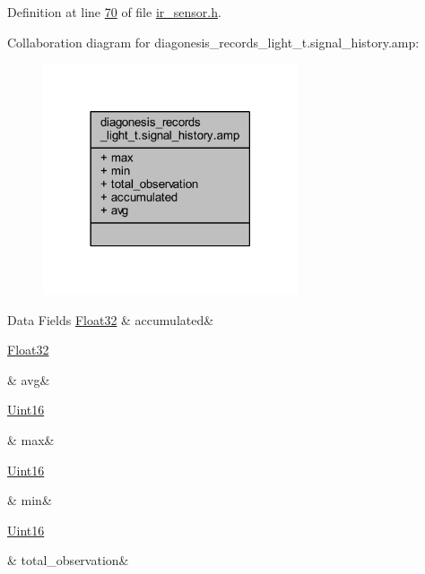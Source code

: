 Definition at line \hyperlink{a00017_source_l00070}{70} of file \hyperlink{a00017_source}{ir\+\_\+sensor.\+h}.



Collaboration diagram for diagonesis\+\_\+records\+\_\+light\+\_\+t.\+signal\+\_\+history.\+amp\+:\nopagebreak
\begin{figure}[H]
\begin{center}
\leavevmode
\includegraphics[width=213pt]{d6/d82/a00920}
\end{center}
\end{figure}
\begin{DoxyFields}{Data Fields}
\hypertarget{a00017_a5f926b5475963464445c0d2055786b5f}{\hyperlink{a00072_a87d38f886e617ced2698fc55afa07637}{Float32}}\label{a00017_a5f926b5475963464445c0d2055786b5f}
&
accumulated&
\\
\hline

\hypertarget{a00017_ae322d423f075b0ab2daad27011d24909}{\hyperlink{a00072_a87d38f886e617ced2698fc55afa07637}{Float32}}\label{a00017_ae322d423f075b0ab2daad27011d24909}
&
avg&
\\
\hline

\hypertarget{a00017_a2ffe4e77325d9a7152f7086ea7aa5114}{\hyperlink{a00072_a59a9f6be4562c327cbfb4f7e8e18f08b}{Uint16}}\label{a00017_a2ffe4e77325d9a7152f7086ea7aa5114}
&
max&
\\
\hline

\hypertarget{a00017_ad8bd79cc131920d5de426f914d17405a}{\hyperlink{a00072_a59a9f6be4562c327cbfb4f7e8e18f08b}{Uint16}}\label{a00017_ad8bd79cc131920d5de426f914d17405a}
&
min&
\\
\hline

\hypertarget{a00017_a5c752d693b04fadbacceeaffb3adf49a}{\hyperlink{a00072_a59a9f6be4562c327cbfb4f7e8e18f08b}{Uint16}}\label{a00017_a5c752d693b04fadbacceeaffb3adf49a}
&
total\+\_\+observation&
\\
\hline

\end{DoxyFields}
\label{de/d08/a00381}
\hypertarget{a00017_de/d08/a00381}{}
